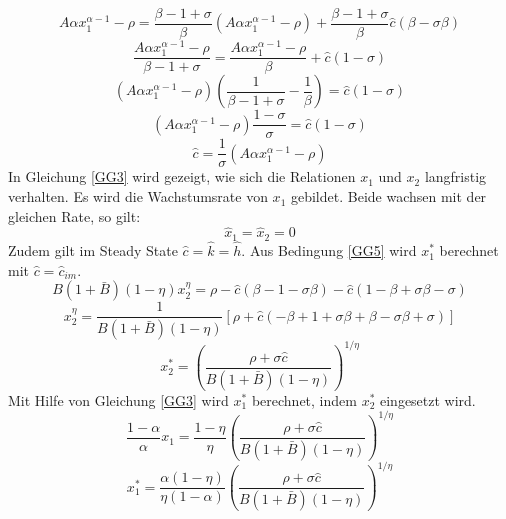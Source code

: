 \begin{equation*}
A\alpha x_1^{\alpha-1}-\rho=\frac{\beta-1+\sigma}{\beta}(A\alpha x_1^{\alpha-1}-\rho)+\frac{\beta-1+\sigma}{\beta}\hat{c}(\beta-\sigma\beta)
\end{equation*}
\begin{equation*}
\frac{A\alpha x_1^{\alpha-1}-\rho}{\beta-1+\sigma}=\frac{A\alpha x_1^{\alpha-1}-\rho}{\beta}+\hat{c}(1-\sigma)
\end{equation*}
\begin{equation*}
(A\alpha x_1^{\alpha-1}-\rho)\left(\frac{1}{\beta-1+\sigma}-\frac{1}{\beta}\right)=\hat{c}(1-\sigma)
\end{equation*}
\begin{equation*}
(A\alpha x_1^{\alpha-1}-\rho)\frac{1-\sigma}{\sigma}=\hat{c}(1-\sigma)
\end{equation*}
\begin{equation}
\boxed{\hat{c}=\frac{1}{\sigma}(A\alpha x_1^{\alpha-1}-\rho)}\label{KRRGG}
\end{equation}
In Gleichung \eqref{GG3} wird gezeigt, wie sich die Relationen $x_1$ und $x_2$ langfristig verhalten. Es wird die Wachstumsrate von $x_1$ gebildet. Beide wachsen mit der gleichen Rate, so gilt:
\begin{equation}
\hat{x}_1=\hat{x}_2=0
\end{equation}
Zudem gilt im Steady State $\hat{c}=\hat{k}=\hat{h}$.
Aus Bedingung \eqref{GG5} wird $x_1^*$ berechnet mit $\hat{c}=\hat{c}_{im}$.
\begin{equation}
B(1+\bar{B})(1-\eta)x_2^\eta=\rho-\hat{c}(\beta-1-\sigma\beta)-\hat{c}(1-\beta+\sigma\beta-\sigma)
\end{equation}
\begin{equation*}
x_2^\eta=\frac{1}{B(1+\bar{B})(1-\eta)}\left[\rho+\hat{c}(-\beta+1+\sigma\beta+\beta-\sigma\beta+\sigma)\right]
\end{equation*}
\begin{equation}
x_2^*=\left(\frac{\rho+\sigma\hat{c}}{B(1+\bar{B})(1-\eta)}\right)^{1/\eta}
\end{equation}
Mit Hilfe von Gleichung \eqref{GG3} wird $x_1^*$ berechnet, indem $x_2^*$ eingesetzt wird.
\begin{equation}
\frac{1-\alpha}{\alpha}x_1 =\frac{1-\eta}{\eta}\left(\frac{\rho+\sigma\hat{c}}{B(1+\bar{B})(1-\eta)}\right)^{1/\eta}
\end{equation}
\begin{equation}
x_1^* =\frac{\alpha(1-\eta)}{\eta(1-\alpha)}\left(\frac{\rho+\sigma\hat{c}}{B(1+\bar{B})(1-\eta)}\right)^{1/\eta}
\end{equation}
